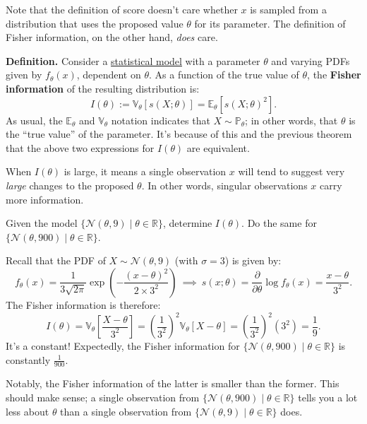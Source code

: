 Note that the definition of score doesn't care whether $x$ is sampled
from a distribution that uses the proposed value $\theta$ for its parameter.
The definition of Fisher information, on the other hand, \emph{does} care.

\textbf{Definition.} Consider a \underline{statistical model} with a parameter $\theta$
and varying PDFs given by $f_{\theta}(x)$, dependent on $\theta$.
As a function of the true value of $\theta$, the \textbf{Fisher information}
of the resulting distribution is:
\[ I(\theta) := \mathbb{V}_{\theta}\left[s(X; \theta)\right]
= \mathbb{E}_{\theta}[s(X; \theta)^2]. \]
As usual, the $\mathbb{E}_{\theta}$ and $\mathbb{V}_{\theta}$ notation
indicates that $X \sim \mathbb{P}_{\theta}$; in other words, that $\theta$ is the ``true value''
of the parameter.  It's because of this and the previous theorem
that the above two expressions for $I(\theta)$ are equivalent.

When $I(\theta)$ is large,
it means a single observation $x$ will tend to suggest
very \emph{large} changes to the proposed $\theta$.
In other words, singular observations $x$ carry more information.

\begin{problem}
    Given the model $\{\mathcal{N}(\theta, 9) \mid \theta \in \mathbb{R}\}$,
    determine $I(\theta)$.  Do the same for $\{\mathcal{N}(\theta, 900) \mid \theta \in \mathbb{R}\}$.
\end{problem}

\begin{solution}
    Recall that the PDF of $X \sim \mathcal{N}(\theta, 9)$ (with $\sigma = 3$) is given by:
    \[ f_{\theta}(x) = \frac{1}{3\sqrt{2\pi}} \exp\left(-\frac{(x - \theta)^2}{2 \times 3^2}\right)
    ~ \implies ~ s(x; \theta) = \frac{\partial}{\partial\theta} \log f_{\theta}(x)
    = \frac{x - \theta}{3^2}. \]
    The Fisher information is therefore:
    \[ I(\theta) = \mathbb{V}_{\theta}\left[ \frac{X - \theta}{3^2} \right]
    = \left(\frac{1}{3^2}\right)^2 \mathbb{V}_{\theta}[X - \theta]
    = \left(\frac{1}{3^2}\right)^2(3^2) = \frac{1}{9}. \]
    It's a constant!
    Expectedly, the Fisher information for $\{\mathcal{N}(\theta, 900) \mid \theta \in \mathbb{R}\}$
    is constantly $\frac{1}{900}$.
    
    Notably, the Fisher information of the latter is smaller than the former.
    This should make sense; a single observation from
    $\{\mathcal{N}(\theta, 900) \mid \theta \in \mathbb{R}\}$
    tells you a lot less about $\theta$ than a single observation from
    $\{\mathcal{N}(\theta, 9) \mid \theta \in \mathbb{R}\}$ does.
\end{solution}

